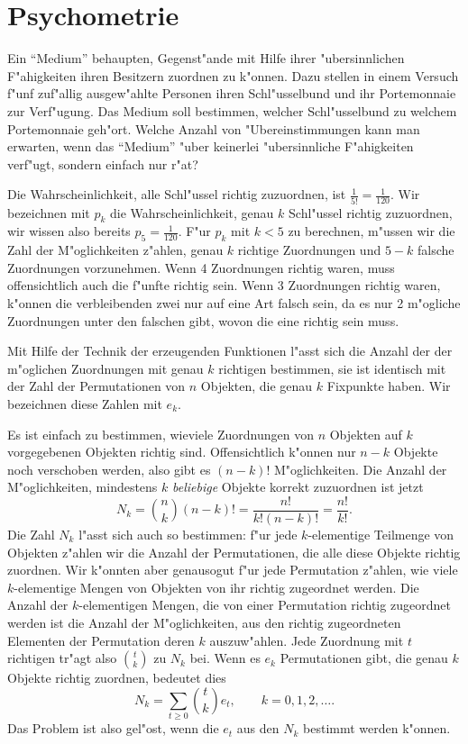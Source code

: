 \section{Psychometrie}
Ein ``Medium'' behaupten, Gegenst"ande mit Hilfe ihrer "ubersinnlichen F"ahigkeiten
ihren Besitzern zuordnen zu k"onnen.
Dazu stellen in einem Versuch f"unf
zuf"allig ausgew"ahlte Personen ihren Schl"usselbund und ihr Portemonnaie zur
Ver\-f"ugung.
Das Medium soll bestimmen, welcher Schl"usselbund zu welchem
Portemonnaie geh"ort.
Welche Anzahl von "Ubereinstimmungen kann man erwarten, wenn das ``Medium''
"uber keinerlei "ubersinnliche F"ahigkeiten verf"ugt, sondern einfach nur r"at?

Die Wahrscheinlichkeit, alle Schl"ussel richtig zuzuordnen, ist $\frac1{5!}=\frac1{120}$.
Wir bezeichnen mit $p_k$ die Wahrscheinlichkeit, genau $k$ Schl"ussel richtig zuzuordnen,
wir wissen also bereits $p_5=\frac1{120}$.
F"ur $p_k$ mit $k<5$ zu berechnen, 
m"ussen wir die Zahl der M"oglichkeiten z"ahlen, genau $k$ richtige Zuordnungen
und $5-k$ falsche Zuordnungen vorzunehmen.
Wenn 4 Zuordnungen richtig waren,
muss offensichtlich auch die f"unfte richtig sein.
Wenn 3 Zuordnungen richtig waren,
k"onnen die verbleibenden zwei nur auf eine Art falsch sein, da es nur 2 m"ogliche
Zuordnungen unter den falschen gibt, wovon die eine richtig sein muss.

Mit Hilfe der Technik der erzeugenden Funktionen l"asst sich die Anzahl der
der m"oglichen Zuordnungen mit genau $k$ richtigen bestimmen, sie ist identisch
mit der Zahl der Permutationen von $n$ Objekten, die genau $k$ Fixpunkte haben.
Wir bezeichnen diese Zahlen mit $e_k$.

Es ist einfach zu bestimmen, wieviele Zuordnungen von $n$ Objekten auf $k$
vorgegebenen Objekten richtig sind.
Offensichtlich k"onnen nur $n-k$ Objekte
noch verschoben werden, also gibt es $(n-k)!$ M"oglichkeiten.
Die Anzahl der M"oglichkeiten, mindestens $k$ {\it beliebige} Objekte korrekt
zuzuordnen ist jetzt
$$N_k=\binom{n}{k}(n-k)!=\frac{n!}{k!(n-k)!}=\frac{n!}{k!}.$$
Die Zahl $N_k$ l"asst sich auch so bestimmen: f"ur jede $k$-elementige
Teilmenge von Objekten z"ahlen wir die Anzahl der Permutationen, die 
alle diese Objekte richtig zuordnen.
Wir k"onnten aber genausogut
f"ur jede Permutation z"ahlen, wie viele $k$-elementige Mengen von Objekten
von ihr richtig zugeordnet werden.
Die Anzahl der $k$-elementigen Mengen,
die von einer Permutation richtig zugeordnet werden ist die Anzahl der
M"oglichkeiten, aus den richtig zugeordneten Elementen der Permutation
deren $k$ auszuw"ahlen.
Jede Zuordnung mit $t$ richtigen tr"agt also
$\binom{t}{k}$ zu $N_k$ bei.
Wenn es $e_k$ Permutationen gibt,
die genau $k$ Objekte richtig zuordnen, bedeutet dies
$$N_k=\sum_{t\ge 0}\binom{t}{k}e_t,\qquad k=0,1,2,\dots.$$
Das Problem ist also gel"ost, wenn die $e_t$ aus den $N_k$ bestimmt werden k"onnen.

